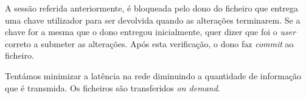 A sessão referida anteriormente, é bloqueada pelo dono do ficheiro que entrega uma chave utilizador para ser devolvida quando as alterações terminarem. Se a chave for a mesma que o dono entregou inicialmente, quer dizer que foi o \textit{user} correto a submeter as alterações. Após esta verificação, o dono faz \textit{commit} ao ficheiro.

Tentámos minimizar a latência na rede diminuindo a quantidade de informação que é transmida. Os ficheiros são transferidos \textit{on demand}.